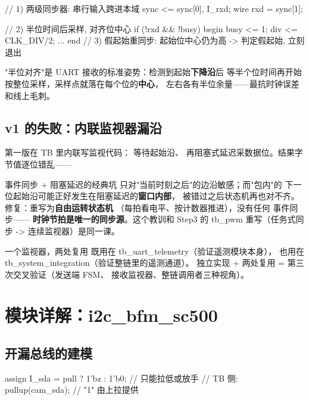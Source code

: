\begin{Verilog}
// 1) 两级同步器: 串行输入跨进本域
sync <= {sync[0], I_rxd};   wire rxd = sync[1];

// 2) 半位时间后采样, 对齐位中心
if (!rxd && !busy) begin busy <= 1; div <= CLK_DIV/2; ... end
// 3) 假起始重同步: 起始位中心仍为高 -> 判定假起始, 立刻退出
\end{Verilog}

"半位对齐"是 UART 接收的标准姿势：检测到起始\textbf{下降沿}后
等半个位时间再开始按整位采样，采样点就落在每个位的\textbf{中心}，
左右各有半位余量——最抗时钟误差和线上毛刺。

\subsection{v1 的失败：内联监视器漏沿}

第一版在 TB 里内联写监视代码： 等待起始沿、
再阻塞式延迟采数据位。结果字节值逐位错乱——

\begin{warnbox}{事件同步 + 阻塞延迟的经典坑}
 只对"当前时刻之后"的边沿敏感；而"包内"的
下一位起始沿可能正好发生在阻塞延迟的\textbf{窗口内部}，
被错过之后状态机再也对不齐。修复：重写为\textbf{自由运转状态机}
（每拍看电平、按计数器推进），没有任何  事件同步——
\textbf{时钟节拍是唯一的同步源}。这个教训和 Step3 的
tb\_pwm 重写（任务式同步 -> 连续监视器）是同一课。
\end{warnbox}

\begin{tipbox}{一个监视器，两处复用}
 既用在 tb\_uart\_telemetry（验证遥测模块本身），
也用在 tb\_system\_integration（验证整链里的遥测通道）。
独立实现 + 两处复用 = 第三次交叉验证（发送端 FSM、
接收监视器、整链调用者三种视角）。
\end{tipbox}

\section{模块详解：i2c\_bfm\_sc500}

\subsection{开漏总线的建模}

\begin{Verilog}
assign I_sda = pull ? 1'bz : 1'b0;   // 只能拉低或放手
// TB 侧: pullup(cam_sda);           // "1" 由上拉提供
\end{Verilog}

